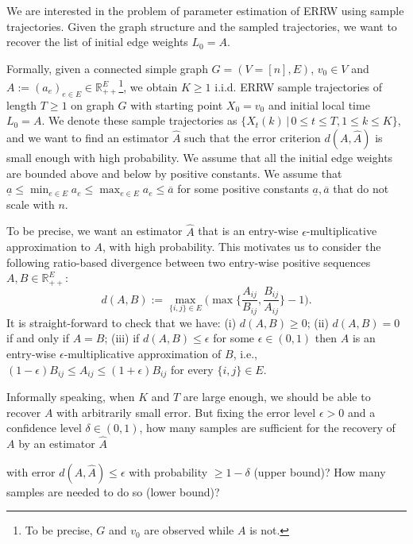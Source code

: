 \documentclass[a4paper, 11pt]{article}
\newif\ifva
\begin{document}
We are interested in the problem of parameter estimation of ERRW using sample trajectories. Given the graph structure and the sampled trajectories, we want to recover the list of initial edge weights $L_0=A$. 

Formally, given a connected simple graph $G=(V=[n], E)$, $v_0\in V$ and $A:=(a_e)_{e\in E}\in\mathbb{R}_{++}^E$\footnote{To be precise, $G$ and $v_0$ are observed while $A$ is not.}, we obtain 
$K \ge 1$
i.i.d. ERRW sample trajectories of length %
$T \ge 1$
on graph $G$ with starting point $X_0=v_0$ and initial local time $L_0=A$. We denote these sample trajectories as $\big\{X_t(k)\,\big|\,0 \le t\leq T, 1 \le k\leq K\big\}$, and we want to find an estimator $\hat{A}$ such that the error criterion $d(A,\hat{A})$ is small enough with high probability. We assume that all the initial edge weights are bounded above and below by positive constants. We assume that $\underline{a}\leq \min_{e\in E} a_e\leq \max_{e\in E} a_e \leq \overline{a}$ for some positive constants $\underline{a}, \overline{a}$ that do not scale with $n$.

To be precise, 
we want an estimator $\hat{A}$ that is an entry-wise $\epsilon$-multiplicative approximation to $A$, with high probability. This motivates us to consider the following ratio-based divergence between two entry-wise positive %
sequences $A, B\in\mathbb{R}_{++}^E$:
\[d(A,B):=\max_{\{i,j\} \in E}\bigg(\max\bigg\{\frac{A_{ij}}{B_{ij}}, \frac{B_{ij}}{A_{ij}}\bigg\}-1\bigg).\]
It is straight-forward to check that we have: (i) $d(A, B)\geq 0$; (ii) $d(A, B)=0$ if and only if $A=B$; (iii) if $d(A,B)\leq \epsilon$ 
for some $\epsilon\in(0,1)$ 
then $A$ is an entry-wise $\epsilon$-multiplicative approximation of $B$, i.e., $(1-\epsilon)B_{ij}\leq A_{ij}\leq (1+\epsilon)B_{ij}$ for every $\{i,j\} \in E$.
\ifva
\color{red}
\color{black}
\fi

Informally speaking, when $K$ and $T$ are large enough, we should be able to recover $A$ with arbitrarily small error. But fixing the error level $\epsilon>0$ and a confidence level $\delta\in(0,1)$, how many samples are sufficient for the recovery of $A$ 
by an estimator $\hat{A}$
\ifva
\color{red}
\color{black}
\fi
with error $d(A,\hat{A})\leq \epsilon$ with probability $\geq 1-\delta$ (upper bound)? How many samples are needed to do so (lower bound)?
\end{document}
